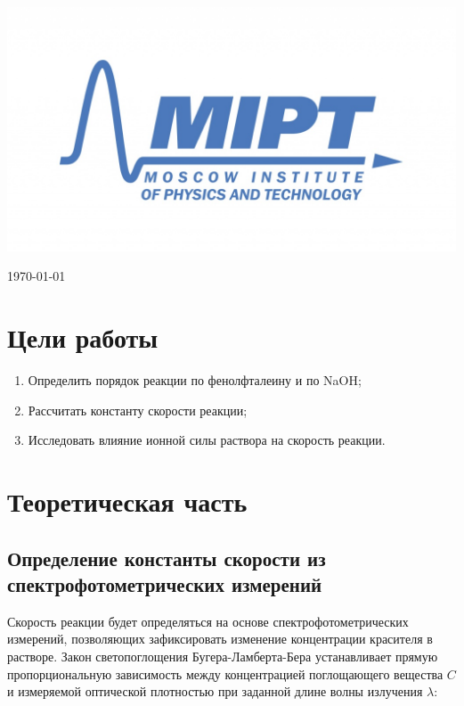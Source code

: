 \documentclass[a4paper, 12pt]{article}
\newenvironment{bottompar}{\par\vspace*{\fill}}{\clearpage}
\begin{document}
\begin{titlepage}
\begin{bottompar}
	\begin{center}
		\includegraphics[width = 80 mm]{logo.jpg}
	\end{center}
	{\large \today}

\end{bottompar}
\vfill %

\end{titlepage}

\newpage
\section{Цели работы}
	\begin{enumerate}
	
		\item Определить порядок реакции по фенолфталеину и по NaOH;
		
		\item Рассчитать константу скорости реакции;
		
		\item Исследовать
влияние ионной силы раствора на скорость реакции.
	
	\end{enumerate}
	
\section{Теоретическая часть}
	\subsection*{Определение константы скорости из спектрофотометрических измерений}
	Скорость реакции будет определяться на основе спектрофотометрических
измерений, позволяющих зафиксировать изменение концентрации красителя в растворе. Закон светопоглощения Бугера-Ламберта-Бера устанавливает прямую
пропорциональную зависимость между концентрацией поглощающего вещества $C$ и
измеряемой оптической плотностью при заданной длине волны излучения $\lambda$:
\end{document}
